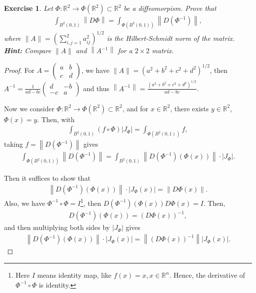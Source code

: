 \documentclass[11pt]{article}
\newtheorem{exercise}{Exercise}[section]
\theoremstyle{definition}
\numberwithin{equation}{subsection}
\begin{document}
\begin{exercise}{\rm *}
Let $\Phi: \mathbb{R}^2 \to \Phi\left(\mathbb{R}^2\right) \subset \mathbb{R}^2$ be a diffeomorpism. Prove that
\begin{align*}
    \int_{B^2(0,1)} \left\|D\Phi \right\| = \int_{\Phi(B^2(0,1))} \left\|D\left(\Phi^{-1}\right) \right\|,
\end{align*}
where $\|A\| = \left(\sum^2_{i,j=1} a_{ij}^2\right)^{1/2}$ is the Hilbert-Schmidt norm of the matrix.\\
{\bf Hint:} Compare $\|A\|$ and $\left\|A^{-1}\right\|$ for a $2 \times 2$ matrix.
\end{exercise}
\begin{proof}
For $A = \begin{pmatrix} 
    a & b \\
    c & d
\end{pmatrix}$, we have $\|A\| = \left(a^2 + b^2 + c^2 + d^2\right)^{1/2}$, then $A^{-1} = \frac{1}{ad - bc}\begin{pmatrix} 
    d & -b \\
    -c & a
\end{pmatrix}$ and thus $\left\|A^{-1}\right\| = \frac{\left(a^2 + b^2 + c^2 + d^2\right)^{1/2}}{ad - bc}$. 

Now we consider $\Phi: \mathbb{R}^2 \to \Phi\left(\mathbb{R}^2\right) \subset \mathbb{R}^2$, and for $x \in \mathbb{R}^2$, there exists $y \in \mathbb{R}^2$, $\Phi(x) = y$. Then, with 
\begin{align*}
    \int_{B^2(0,1)} (f \circ \Phi)\left|J_\Phi\right| = \int_{\Phi\left(B^2(0,1)\right)} f,
\end{align*}
taking $f = \left\|D\left(\Phi^{-1}\right) \right\|$ gives
\begin{align*}
    \int_{\Phi\left(B^2(0,1)\right)} \left\|D\left(\Phi^{-1}\right) \right\| = \int_{B^2(0,1)} \left\|D\left(\Phi^{-1}\right) (\Phi(x)) \right\| \cdot \left|J_\Phi\right|.
\end{align*}

Then it suffices to show that
\begin{align*}
    \left\|D\left(\Phi^{-1}\right) (\Phi(x)) \right\| \cdot \left|J_\Phi(x)\right| = \left\|D\Phi(x) \right\|.
\end{align*}
Also, we have $\Phi^{-1} \circ \Phi = I$\footnote{Here $I$ means identity map, like $f(x) = x, x \in \mathbb{R}^n$. Hence, the derivative of $\Phi^{-1} \circ \Phi$ is identity.}, then $D\left(\Phi^{-1}\right)(\Phi(x)) D\Phi(x) = I$. Then,
\begin{align*}
    D\left(\Phi^{-1}\right)(\Phi(x)) = \left(D\Phi(x)\right)^{-1},
\end{align*}
and then multiplying both sides by $\left|J_\Phi\right|$ gives
\begin{align*}
    \left\|D\left(\Phi^{-1}\right) (\Phi(x)) \right\| \cdot \left|J_\Phi(x)\right| = \left\|\left(D\Phi(x)\right)^{-1} \right\| \left|J_\Phi(x)\right|.
\end{align*}


\end{proof}
\end{document}
